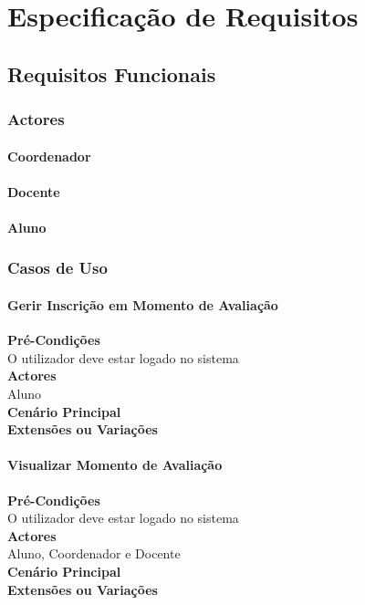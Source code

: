 \chapter{Especificação de Requisitos}

\paragraph{}

\section{Requisitos Funcionais}

\subsection{Actores}

\subsubsection{Coordenador}

\subsubsection{Docente}

\subsubsection{Aluno}



\subsection{Casos de Uso}

\subsubsection{Gerir Inscrição em Momento de Avaliação}
	\textbf{Pré-Condições}\\
	O utilizador deve estar logado no sistema\\
	\textbf{Actores}\\
	Aluno\\
	\textbf{Cenário Principal}\\
	\textbf{Extensões ou Variações}\\

\subsubsection{Visualizar Momento de Avaliação}
	\textbf{Pré-Condições}\\
	O utilizador deve estar logado no sistema\\
	\textbf{Actores}\\
	Aluno, Coordenador e Docente\\
	\textbf{Cenário Principal}\\
	\textbf{Extensões ou Variações}\\

